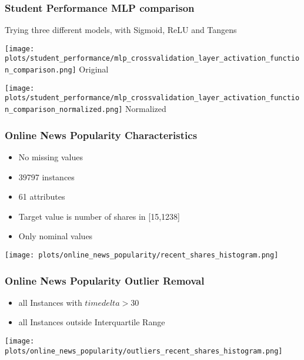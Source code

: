 \documentclass[aspectratio=169]{beamer}
\begin{document}
\begin{frame}{}
\frametitle{Student Performance MLP comparison}
\center Trying three different models, with Sigmoid, ReLU and Tangens
\begin{minipage}{0.49\textwidth}
    \texttt{[image: plots/student\_performance/mlp\_crossvalidation\_layer\_activation\_function\_comparison.png]}
    \center Original
\end{minipage}
\begin{minipage}{0.49\textwidth}
    \texttt{[image: plots/student\_performance/mlp\_crossvalidation\_layer\_activation\_function\_comparison\_normalized.png]}
    \center Normalized
\end{minipage}
\end{frame}


\begin{frame}{}
\frametitle{Online News Popularity Characteristics}
\begin{minipage}{0.3\textwidth}
\begin{itemize}
\item No missing values
\item 39797 instances
\item 61 attributes
\item Target value is number of shares in [15,1238]
\item Only nominal values
\end{itemize}
\end{minipage}
\begin{minipage}{0.69\textwidth}
    \texttt{[image: plots/online\_news\_popularity/recent\_shares\_histogram.png]}
\end{minipage}
\end{frame}

\begin{frame}{}
\frametitle{Online News Popularity Outlier Removal}
\begin{minipage}{0.3\textwidth}
\begin{itemize}
\item all Instances with $timedelta>30$
\item all Instances outside Interquartile Range
\end{itemize}
\end{minipage}
\begin{minipage}{0.69\textwidth}
    \texttt{[image: plots/online\_news\_popularity/outliers\_recent\_shares\_histogram.png]}
\end{minipage}
\end{frame}
\end{document}
